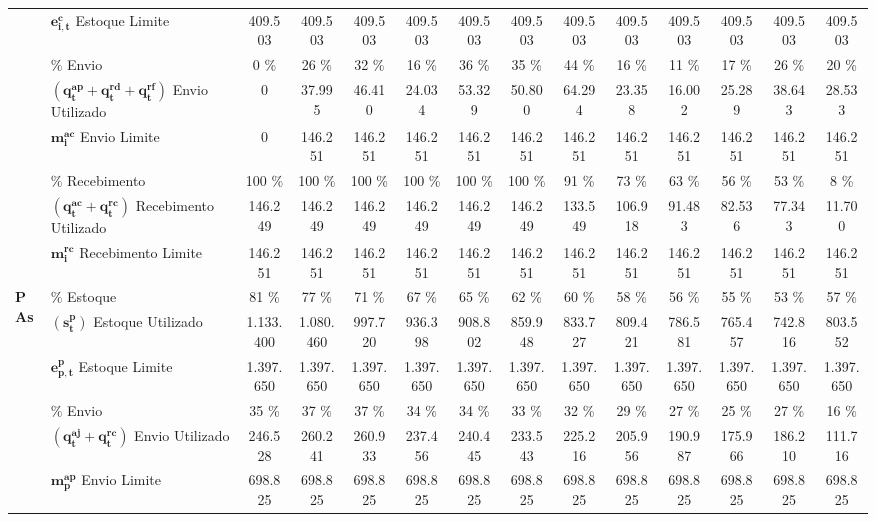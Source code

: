 \begin{table}
{\begin{tabular}{|l|l|c|c|c|c|c|c|c|c|c|c|c|c|}
& $\mathbf{e^{c}_{i,t}}$ Estoque Limite & 409.503 & 409.503 & 409.503 & 409.503 & 409.503 & 409.503 & 409.503 & 409.503 & 409.503 & 409.503 & 409.503 & 409.503 \\\cline{2-14}
& $\mathbf{\%}$ Envio & 0 \% & 26 \% & 32 \% & 16 \% & 36 \% & 35 \% & 44 \% & 16 \% & 11 \% & 17 \% & 26 \% & 20 \% \\\cline{2-14}
& $(\mathbf{q^{ap}_{t} + q^{rd}_{t} + q^{rf}_{t}})$ Envio Utilizado & 0 & 37.995 & 46.410 & 24.034 & 53.329 & 50.800 & 64.294 & 23.358 & 16.002 & 25.289 & 38.643 & 28.533 \\\cline{2-14}
& $\mathbf{m^{ac}_{i}}$ Envio Limite & 0 & 146.251 & 146.251 & 146.251 & 146.251 & 146.251 & 146.251 & 146.251 & 146.251 & 146.251 & 146.251 & 146.251 \\\cline{2-14}
& $\mathbf{\%}$ Recebimento & 100 \% & 100 \% & 100 \% & 100 \% & 100 \% & 100 \% & 91 \% & 73 \% & 63 \% & 56 \% & 53 \% & 8 \% \\\cline{2-14}
& $(\mathbf{q^{ac}_{t} + q^{rc}_{t}})$ Recebimento Utilizado & 146.249 & 146.249 & 146.249 & 146.249 & 146.249 & 146.249 & 133.549 & 106.918 & 91.483 & 82.536 & 77.343 & 11.700 \\\cline{2-14}
& $\mathbf{m^{rc}_{i}}$ Recebimento Limite & 146.251 & 146.251 & 146.251 & 146.251 & 146.251 & 146.251 & 146.251 & 146.251 & 146.251 & 146.251 & 146.251 & 146.251 \\
\hline
\multirow{9}{*}{\textbf{PAs}} & $\mathbf{\%}$ Estoque & 81 \% & 77 \% & 71 \% & 67 \% & 65 \% & 62 \% & 60 \% & 58 \% & 56 \% & 55 \% & 53 \% & 57 \% \\\cline{2-14}
& $(\mathbf{s^{p}_{t}})$ Estoque Utilizado & 1.133.400 & 1.080.460 & 997.720 & 936.398 & 908.802 & 859.948 & 833.727 & 809.421 & 786.581 & 765.457 & 742.816 & 803.552 \\\cline{2-14}
& $\mathbf{e^{p}_{p,t}}$ Estoque Limite & 1.397.650 & 1.397.650 & 1.397.650 & 1.397.650 & 1.397.650 & 1.397.650 & 1.397.650 & 1.397.650 & 1.397.650 & 1.397.650 & 1.397.650 & 1.397.650 \\\cline{2-14}
& $\mathbf{\%}$ Envio & 35 \% & 37 \% & 37 \% & 34 \% & 34 \% & 33 \% & 32 \% & 29 \% & 27 \% & 25 \% & 27 \% & 16 \% \\\cline{2-14}
& $(\mathbf{q^{aj}_{t} + q^{rc}_{t}})$ Envio Utilizado & 246.528 & 260.241 & 260.933 & 237.456 & 240.445 & 233.543 & 225.216 & 205.956 & 190.987 & 175.966 & 186.210 & 111.716 \\\cline{2-14}
& $\mathbf{m^{ap}_{p}}$ Envio Limite & 698.825 & 698.825 & 698.825 & 698.825 & 698.825 & 698.825 & 698.825 & 698.825 & 698.825 & 698.825 & 698.825 & 698.825 \\\cline{2-14}

\end{tabular}}
\end{table}
